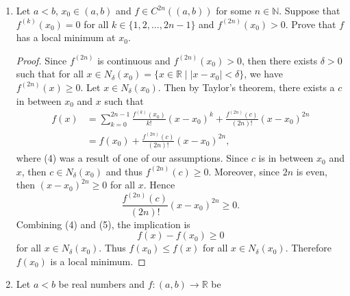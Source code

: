 \documentclass[12pt]{article}
\begin{document}
\begin{enumerate}
\begin{proof}
                that $x_0f'(x_0)-f(x_0)\geq 0$. Since $x_0>0$, then 
                \begin{equation*}
                    g'(x_0)=\frac{x_0f'(x_0)-f(x_0)}{x}\geq 0.
                \end{equation*}
                Finally, since $x_0$ was arbitrary, then $g'(x)\geq 0$ for all
                $x\in(0, \infty)$ as desired. 
            \end{proof}
        \item Let $a<b$, $x_0\in(a, b)$ and $f\in C^{2n}((a, b))$ for some
            $n\in\mathbb{N}$. Suppose that $f^{(k)}(x_0)=0$ for all $k\in\{1,
            2, \dots, 2n-1\}$ and $f^{(2n)}(x_0)>0$. Prove that $f$ has a local
            minimum at $x_0$. 
            \begin{proof}
                Since $f^{(2n)}$ is continuous and $f^{(2n)}(x_0)>0$, then
                there exists $\delta>0$ such that for all $x\in
                N_{\delta}(x_0)=\{x\in\mathbb{R}\mid |x-x_0|<\delta\}$, we have
                $f^{(2n)}(x)\geq 0$. Let $x\in N_{\delta}(x_0)$. Then by
                Taylor's theorem, there exists a $c$ in between $x_0$ and $x$
                such that 
                \begin{align}
                    f(x)&=\sum_{k=0}^{2n-1}\frac{f^{(k)}(x_0)}{k!}
                    (x-x_0)^k+\frac{f^{(2n)}(c)}{(2n)!}(x-x_0)^{2n} \\
                    &=f(x_0)+\frac{f^{(2n)}(c)}{(2n)!}(x-x_0)^{2n},
                \end{align}
                where (4) was a result of one of our
                assumptions. Since $c$ is in between $x_0$ and $x$, then $c\in
                N_{\delta}(x_0)$ and thus $f^{(2n)}(c)\geq 0$. Moreover, since
                $2n$ is even, then $(x-x_0)^{2n}\geq 0$ for all $x$. Hence
                \begin{equation}
                    \frac{f^{(2n)}(c)}{(2n)!}(x-x_0)^{2n}\geq 0.
                \end{equation}
                Combining (4) and (5), the implication is
                \begin{equation}
                    f(x)-f(x_0)\geq 0
                \end{equation}
                for all $x\in N_{\delta}(x_0)$. Thus $f(x_0)\leq f(x)$ for all
                $x\in N_{\delta}(x_0)$. Therefore $f(x_0)$ is a local minimum. 
            \end{proof}
        \item Let $a<b$ be real numbers and $f:(a, b)\to\mathbb{R}$ be

\end{enumerate}
\end{document}
